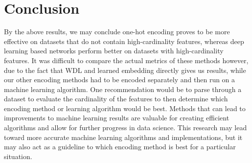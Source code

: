 \documentclass[12pt,letterpaper]{article}
\theoremstyle{plain}
\theoremstyle{definition}
\begin{document}
\section{Conclusion}

\hspace{\parindent}By the above results, we may conclude one-hot encoding proves to be more effective on datasets that do not contain high-cardinality features, whereas deep learning based networks perform better on datasets with high-cardinality features. It was difficult to compare the actual metrics of these methods however, due to the fact that WDL and learned embedding directly gives us results, while our other encoding methods had to be encoded separately and then run on a machine learning algorithm. One recommendation would be to parse through a dataset to evaluate the cardinality of the features to then determine which encoding method or learning algorithm would be best. Methods that can lead to improvements to machine learning results are valuable for creating efficient algorithms and allow for further progress in data science. This research may lead toward more accurate machine learning algorithms and implementations, but it may also act as a guideline to which encoding method is best for a particular situation.



\end{document}
